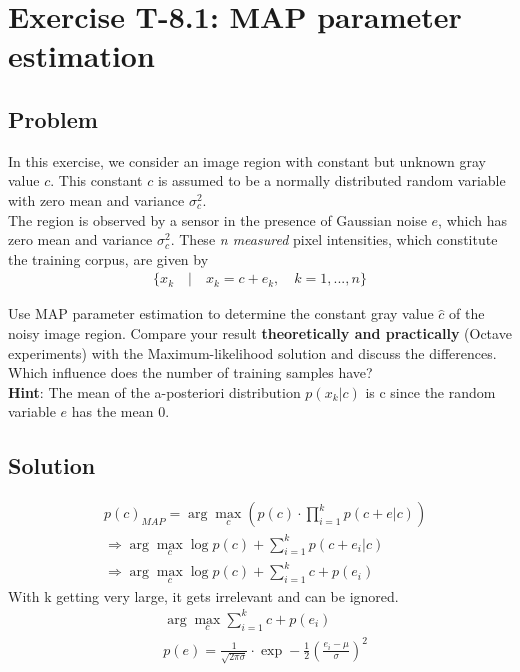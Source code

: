 \section*{Exercise T-8.1: MAP parameter estimation}

\subsection*{Problem}
In this exercise, we consider an image region with constant but unknown gray value $c$.
This constant $c$ is assumed to be a normally distributed random variable with zero mean and variance $\sigma_c^2$.\\

The region is observed by a sensor in the presence of Gaussian noise $e$, which has zero mean and variance $\sigma_c^2$.
These\textit{ n measured} pixel intensities, which constitute the training corpus, are given by
\begin{align*}
	\{x_k\quad |\quad x_k = c + e_k,\quad k = 1,...,n\}
\end{align*}

Use MAP parameter estimation to determine the constant gray value $\hat{c}$ of the noisy image region.
Compare your result \textbf{theoretically and practically} (Octave experiments) with the Maximum-likelihood solution and discuss the differences.
Which influence does the number of training samples have?\\

\textbf{Hint}: The mean of the a-posteriori distribution $p(x_k|c)$ is c since the random variable $e$ has the mean 0.

\subsection*{Solution}
\begin{align*}
	&p(c)_{MAP}=\arg\max_c(p(c)\cdot\prod_{i=1}^{k} p(c+e|c))\\
	&\Rightarrow\arg\max_c \log p(c)+\sum_{i=1}^{k}p(c+e_i|c)\\
	&\Rightarrow\arg\max_c \log p(c)+\sum_{i=1}^{k}c+p(e_i)
\end{align*}
With k getting very large, it gets irrelevant and can be ignored.
\begin{align*}
	&\arg\max_c\sum_{i=1}^{k}c+p(e_i)\\
	&p(e)=\frac{1}{\sqrt{2\pi\sigma}}\cdot\exp-\frac{1}{2}(\frac{e_i-\mu}{\sigma})^2
\end{align*}

